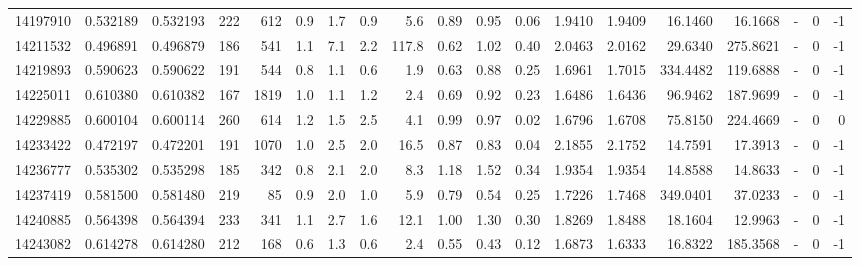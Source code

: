 \begin{tabular}{rrrrrrrrrrrrrrrrlrr}
  14197910 & 0.532189 &   0.532193 &  222 &  612 &      0.9 &      1.7 &     0.9 &      5.6 &       0.89 &        0.95 &        0.06 &  1.9410 &  1.9409 &   16.1460 &   16.1668 &             - &        0 &         -1 \\
  14211532 & 0.496891 &   0.496879 &  186 &  541 &      1.1 &      7.1 &     2.2 &    117.8 &       0.62 &        1.02 &        0.40 &  2.0463 &  2.0162 &   29.6340 &  275.8621 &             - &        0 &         -1 \\
  14219893 & 0.590623 &   0.590622 &  191 &  544 &      0.8 &      1.1 &     0.6 &      1.9 &       0.63 &        0.88 &        0.25 &  1.6961 &  1.7015 &  334.4482 &  119.6888 &             - &        0 &         -1 \\
  14225011 & 0.610380 &   0.610382 &  167 & 1819 &      1.0 &      1.1 &     1.2 &      2.4 &       0.69 &        0.92 &        0.23 &  1.6486 &  1.6436 &   96.9462 &  187.9699 &             - &        0 &         -1 \\
  14229885 & 0.600104 &   0.600114 &  260 &  614 &      1.2 &      1.5 &     2.5 &      4.1 &       0.99 &        0.97 &        0.02 &  1.6796 &  1.6708 &   75.8150 &  224.4669 &             - &        0 &          0 \\
  14233422 & 0.472197 &   0.472201 &  191 & 1070 &      1.0 &      2.5 &     2.0 &     16.5 &       0.87 &        0.83 &        0.04 &  2.1855 &  2.1752 &   14.7591 &   17.3913 &             - &        0 &         -1 \\
  14236777 & 0.535302 &   0.535298 &  185 &  342 &      0.8 &      2.1 &     2.0 &      8.3 &       1.18 &        1.52 &        0.34 &  1.9354 &  1.9354 &   14.8588 &   14.8633 &             - &        0 &         -1 \\
  14237419 & 0.581500 &   0.581480 &  219 &   85 &      0.9 &      2.0 &     1.0 &      5.9 &       0.79 &        0.54 &        0.25 &  1.7226 &  1.7468 &  349.0401 &   37.0233 &             - &        0 &         -1 \\
  14240885 & 0.564398 &   0.564394 &  233 &  341 &      1.1 &      2.7 &     1.6 &     12.1 &       1.00 &        1.30 &        0.30 &  1.8269 &  1.8488 &   18.1604 &   12.9963 &             - &        0 &         -1 \\
  14243082 & 0.614278 &   0.614280 &  212 &  168 &      0.6 &      1.3 &     0.6 &      2.4 &       0.55 &        0.43 &        0.12 &  1.6873 &  1.6333 &   16.8322 &  185.3568 &             - &        0 &         -1 \\

\end{tabular}
